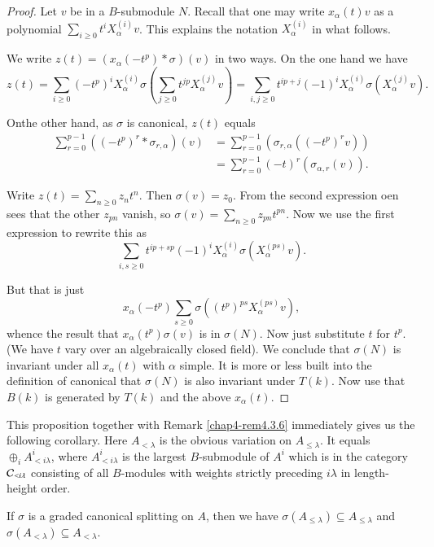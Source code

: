 \begin{proof}
Let $v$ be in a $B$-submodule $N$. Recall that one may write
$x_{\alpha}(t)v$ as a polynomial $\sum_{i\geq
  0}t^{i}X^{(i)}_{\alpha}v$. This explains the notation
$X^{(i)}_{\alpha}$ in what follows.


We write $z(t)=(x_{\alpha}(-t^{p})\ast \sigma)(v)$ in two ways. On the
one hand we have
$$
z(t)=\sum_{i\geq 0}(-t^{p})^{i}X^{(i)}_{\alpha}\sigma\left(\sum_{j\geq
  0}t^{jp}X_{\alpha}^{(j)}v\right)=\sum_{i,j\geq
  0}t^{ip+j}(-1)^{i}X^{(i)}_{\alpha}\sigma(X^{(j)}_{\alpha}v). 
$$

On\pageoriginale the\label{page41} other hand, as $\sigma$ is canonical, $z(t)$
equals
\begin{align*}
\sum^{p-1}_{r=0}((-t^{p})^{r}\ast\sigma_{r,\alpha})(v) &=
\sum^{p-1}_{r=0}(\sigma_{r,\alpha}((-t^{p})^{r}v))\\ 
&= \sum^{p-1}_{r=0}(-t)^{r}(\sigma_{\alpha,r}(v)).
\end{align*}

Write $z(t)=\sum_{n\geq 0}z_{n}t^{n}$. Then $\sigma(v)=z_{0}$. From
the second expression oen sees that the other $z_{pn}$ vanish, so
$\sigma(v)=\sum_{n\geq 0}z_{pn}t^{pn}$. Now we use the first
expression to rewrite this as
$$
\sum_{i,s\geq 0}t^{ip+sp}(-1)^{i}X^{(i)}_{\alpha}\sigma(X^{(ps)}_{\alpha}v).
$$

But that is just
$$
x_{\alpha}(-t^{p})\sum_{s\geq
  0}\sigma((t^{p})^{ps}X^{(ps)}_{\alpha}v),
$$
whence the result that $x_{\alpha}(t^{p})\sigma(v)$ is in
$\sigma(N)$. Now just substitute $t$ for $t^{p}$. (We have $t$ vary
over an algebraically closed field). We conclude that $\sigma(N)$ is
invariant under all $x_{\alpha}(t)$ with $\alpha$ simple. It is more
or less built into the definition of canonical that $\sigma(N)$ is
also invariant under $T(k)$. Now use that $B(k)$ is generated by
$T(k)$ and the above $x_{\alpha}(t)$.
\end{proof}

This proposition together with Remark \ref{chap4-rem4.3.6} immediately
gives us the following corollary. Here $A_{<\lambda}$ is the obvious
variation on $A_{\leq \lambda}$. It equals
$\oplus_{i}A^{i}_{<i\lambda}$, where $A^{i}_{<i\lambda}$ is the
largest $B$-submodule of $A^{i}$ which is in the category
$\mathcal{C}_{<i\lambda}$ consisting of all $B$-modules with weights strictly
preceding $i\lambda$ in length-height order.

\begin{corollary}\label{chap4-coro4.3.8}
If $\sigma$ is a graded canonical splitting on $A$, then we have
$\sigma(A_{\leq \lambda})\subseteq A_{\leq\lambda}$ and
$\sigma(A_{<\lambda})\subseteq A_{<\lambda}$.
\end{corollary}

